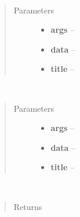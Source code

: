 \documentclass[letterpaper,10pt,english]{sphinxmanual}
\begin{document}

\begin{fulllineitems}
\label{index:bounos.custom_fusion_run}~\begin{quote}\begin{description}
\item[{Parameters}] \leavevmode\begin{itemize}
\item {} 
\textbf{args} -- 

\item {} 
\textbf{data} -- 

\item {} 
\textbf{title} -- 

\end{itemize}

\end{description}\end{quote}

\end{fulllineitems}


\begin{fulllineitems}
\label{index:bounos.custom_metric_run}~\begin{quote}\begin{description}
\item[{Parameters}] \leavevmode\begin{itemize}
\item {} 
\textbf{args} -- 

\item {} 
\textbf{data} -- 

\item {} 
\textbf{title} -- 

\end{itemize}

\end{description}\end{quote}

\end{fulllineitems}


\begin{fulllineitems}
\label{index:bounos.custom_parser}~\begin{quote}\begin{description}
\item[{Returns}] \leavevmode


\end{description}\end{quote}

\end{fulllineitems}
\end{document}
